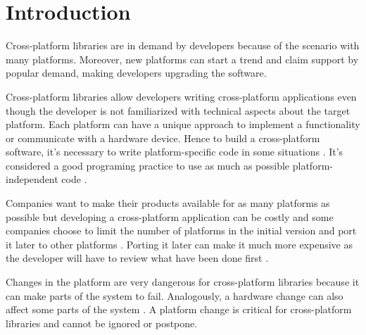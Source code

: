 \documentclass[10pt, conference]{IEEEtran}
\begin{document}
\section{Introduction}

Cross-platform libraries are in demand by developers because of the scenario with many platforms. Moreover, new platforms can start a trend and claim support by popular demand, making developers upgrading the software. 

Cross-platform libraries allow developers writing cross-platform applications even though the developer is not familiarized with technical aspects about the target platform. Each platform can have a unique approach to implement a functionality or communicate with a hardware device. Hence to build a cross-platform software, it’s necessary to write platform-specific code in some situations \cite{bishop2006,backblaze2008}. It's considered a good programing practice to use as much as possible platform-independent code \cite{bishop2006,backblaze2008}. 

Companies want to make their products available for as many platforms as possible but developing a cross-platform application can be costly and some companies choose to limit the number of platforms in the initial version and port it later to other platforms \cite{Fahy2012}. Porting it later can make it much more expensive as the developer will have to review what have been done first \cite{Fahy2012,bishop2006}. 


Changes in the platform are very dangerous for cross-platform libraries because it can make parts of the system to fail. Analogously,  a hardware change can also affect some parts of the system \cite{bishop2006}. A platform change is critical for cross-platform libraries and cannot be ignored or postpone.   






 

\end{document}
